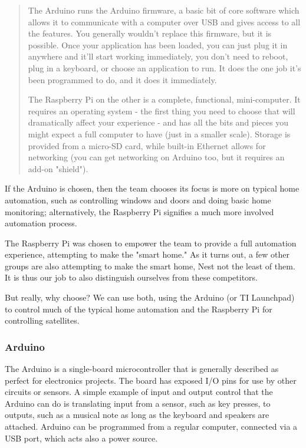 		\begin{quote}
			The Arduino runs the Arduino firmware, a basic bit of core software which allows it to communicate with a computer over USB and gives access to all the features. You generally wouldn't replace this firmware, but it is possible. Once your application has been loaded, you can just plug it in anywhere and it'll start working immediately, you don't need to reboot, plug in a keyboard, or choose an application to run. It does the one job it's been programmed to do, and it does it immediately.
			
			The Raspberry Pi on the other is a complete, functional, mini-computer. It requires an operating system - the first thing you need to choose that will dramatically affect your experience - and has all the bits and pieces you might expect a full computer to have (just in a smaller scale). Storage is provided from a micro-SD card, while built-in Ethernet allows for networking (you can get networking on Arduino too, but it requires an add-on "shield").
		\end{quote}
		
		If the Arduino is chosen, then the team chooses its focus is more on typical home automation, such as controlling windows and doors and doing basic home monitoring; alternatively, the Raspberry Pi signifies a much more involved automation process.
		
		The Raspberry Pi was chosen to empower the team to provide a full automation experience, attempting to make the "smart home."
		As it turns out, a few other groups are also attempting to make the smart home, Nest not the least of them.
		It is thus our job to also distinguish ourselves from these competitors.
		
		But really, why choose?
		We can use both, using the Arduino (or TI Launchpad) to control much of the typical home automation and the Raspberry Pi for controlling satellites.
	
	\subsubsection{Arduino}
	
		The Arduino is a single-board microcontroller that is generally described as perfect for electronics projects. 
		The board has exposed I/O pins for use by other circuits or sensors.
		A simple example of input and output control that the Arduino can do is translating input from a sensor, such as key presses, to outputs, such as a musical note as long as the keyboard and speakers are attached.
		Arduino can be programmed from a regular computer, connected via a USB port, which acts also a power source.
		
